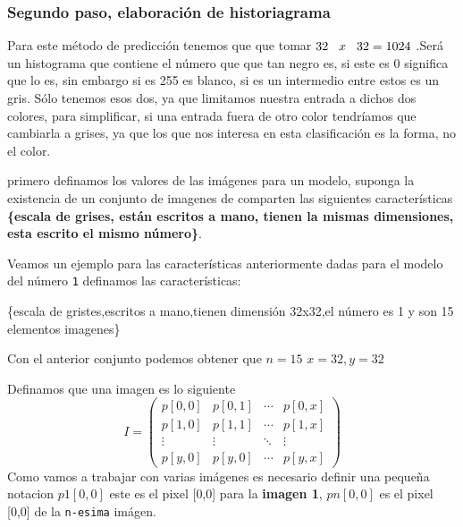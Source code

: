 \documentclass[
  spanish,
]{article}
\begin{document}
\hypertarget{segundo-paso-elaboraciuxf3n-de-historiagrama}{%
\subsubsection{Segundo paso, elaboración de
historiagrama}\label{segundo-paso-elaboraciuxf3n-de-historiagrama}}

Para este método de predicción tenemos que que tomar
\(32 \hspace{0.3cm}x \hspace{0.3cm} 32=1024\) .Será un histograma que
contiene el número que que tan negro es, si este es 0 significa que lo
es, sin embargo si es 255 es blanco, si es un intermedio entre estos es
un gris. Sólo tenemos esos dos, ya que limitamos nuestra entrada a
dichos dos colores, para simplificar, si una entrada fuera de otro color
tendríamos que cambiarla a grises, ya que los que nos interesa en esta
clasificación es la forma, no el color.

primero definamos los valores de las imágenes para un modelo, suponga la
existencia de un conjunto de imagenes de comparten las siguientes
características \textbf{\{escala de grises, están escritos a mano,
tienen la mismas dimensiones, esta escrito el mismo número\}}.

Veamos un ejemplo para las características anteriormente dadas para el
modelo del número \texttt{1} definamos las características:

\{escala de gristes,escritos a mano,tienen dimensión 32x32,el número es
1 y son 15 elementos imagenes\}

Con el anterior conjunto podemos obtener que \(n=15\) \(x=32,y=32\)

Definamos que una imagen es lo siguiente \[
I=
\begin{pmatrix}
p[0,0] & p[0,1] & \cdots & p[0,x]\\
p[1,0] & p[1,1] & \cdots & p[1,x]\\
\vdots & \vdots & \ddots & \vdots\\
p[y,0] & p[y,0] & \cdots & p[y,x]
\end{pmatrix}
\] Como vamos a trabajar con varias imágenes es necesario definir una
pequeña notacion \(p1[0,0]\) este es el pixel {[}0,0{]} para la
\textbf{imagen 1}, \(pn[0,0]\) es el pixel {[}0,0{]} de la
\texttt{n-esima} imágen.
\end{document}

